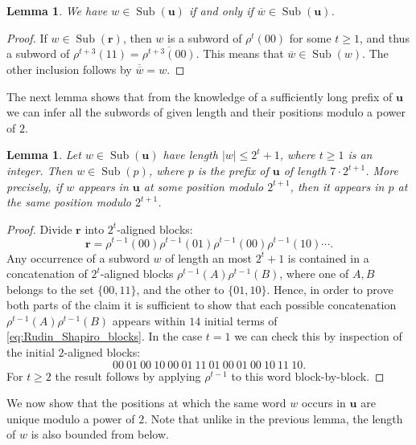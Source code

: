 \documentclass[a4paper,11pt]{amsart}
\newtheorem{lem}[thm]{Lemma}
\theoremstyle{definition}
\newcommand{\Sub}{\operatorname{Sub}}
\begin{document}
\begin{lem} \label{lem:negation}
We have $w \in \Sub(\mathbf{u})$ if and only if $\overline{w} \in \Sub(\mathbf{u})$. 
\end{lem}
\begin{proof}
If $w \in \Sub(\mathbf{r})$, then $w$ is a subword of $\rho^t(00)$ for some $t \geq 1$, and thus a subword of  $\rho^{t+3}(11) = \overline{\rho^{t+3}(00)}$. This means that $\overline{w} \in \Sub(w)$. 
The other inclusion follows by $\overline{\overline{w}} = w$. 
\end{proof}

The next lemma shows that from the knowledge of a sufficiently long prefix of $\mathbf{u}$ we can infer all the subwords of given length and their positions modulo a power of $2$.


\begin{lem} \label{lem:appearance_of_subwords}
Let $w \in \Sub(\mathbf{u})$ have length $|w| \leq 2^t +1$, where $t \geq 1$ is an integer. Then $w \in \Sub(p)$, where $p$ is the prefix of $\mathbf{u}$ of length $7 \cdot 2^{t+1}$. More precisely, if $w$ appears in $\mathbf{u}$ at some position modulo $2^{t+1}$, then it appears in $p$ at the same position modulo $2^{t+1}$.
\end{lem}
\begin{proof}
Divide $\mathbf{r}$ into $2^t$-aligned blocks:
\begin{equation} \label{eq:Rudin_Shapiro_blocks}
\mathbf{r} = \rho^{t-1}(00) \rho^{t-1}(01) \rho^{t-1}(00) \rho^{t-1}(10) \cdots.
\end{equation}
Any occurrence of a subword $w$ of length an most $2^t+1$ is contained in a concatenation of $2^t$-aligned blocks $\rho^{t-1}(A) \rho^{t-1}(B)$, where one of $A,B$ belongs to the set $\{00,11\}$, and the other to $\{01,10\}$. Hence, in order to prove both parts of the claim it is sufficient to show that each possible concatenation $\rho^{t-1}(A) \rho^{t-1}(B)$ appears within $14$ initial terms of \eqref{eq:Rudin_Shapiro_blocks}.
In the case $t=1$ we can check this by inspection of the initial $2$-aligned blocks:
$$00 \: 01 \: 00 \: 10 \: 00 \: 01 \: 11 \: 01 \: 00 \: 01 \: 00 \: 10 \: 11 \: 10.$$
For $t \geq 2$ the result follows by applying $\rho^{t-1}$ to this word block-by-block.
\end{proof}

We now show that the positions at which the same word $w$ occurs in $\mathbf{u}$ are unique modulo a power of $2$. Note that unlike in the previous lemma, the length of $w$ is also bounded from below.
\end{document}
